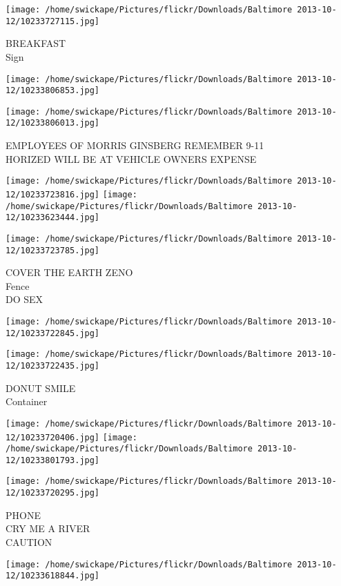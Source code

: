 \documentclass[10pt,letterpaper]{article}
\begin{document}
\vspace{0.25in}
\texttt{[image: /home/swickape/Pictures/flickr/Downloads/Baltimore 2013-10-12/10233727115.jpg]}

BREAKFAST\\
Sign
\pagebreak

\texttt{[image: /home/swickape/Pictures/flickr/Downloads/Baltimore 2013-10-12/10233806853.jpg]}

\vspace{0.25in}
\texttt{[image: /home/swickape/Pictures/flickr/Downloads/Baltimore 2013-10-12/10233806013.jpg]}

EMPLOYEES OF MORRIS GINSBERG REMEMBER 9{-}11\\
HORIZED WILL BE AT VEHICLE OWNERS EXPENSE
\pagebreak

\texttt{[image: /home/swickape/Pictures/flickr/Downloads/Baltimore 2013-10-12/10233723816.jpg]}
\texttt{[image: /home/swickape/Pictures/flickr/Downloads/Baltimore 2013-10-12/10233623444.jpg]}

\texttt{[image: /home/swickape/Pictures/flickr/Downloads/Baltimore 2013-10-12/10233723785.jpg]}

COVER THE EARTH ZENO\\
Fence\\
DO SEX
\pagebreak

\texttt{[image: /home/swickape/Pictures/flickr/Downloads/Baltimore 2013-10-12/10233722845.jpg]}

\vspace{0.25in}
\texttt{[image: /home/swickape/Pictures/flickr/Downloads/Baltimore 2013-10-12/10233722435.jpg]}

DONUT SMILE\\
Container
\pagebreak

\texttt{[image: /home/swickape/Pictures/flickr/Downloads/Baltimore 2013-10-12/10233720406.jpg]}
\texttt{[image: /home/swickape/Pictures/flickr/Downloads/Baltimore 2013-10-12/10233801793.jpg]}

\texttt{[image: /home/swickape/Pictures/flickr/Downloads/Baltimore 2013-10-12/10233720295.jpg]}

PHONE\\
CRY ME A RIVER\\
CAUTION
\pagebreak

\texttt{[image: /home/swickape/Pictures/flickr/Downloads/Baltimore 2013-10-12/10233618844.jpg]}
\end{document}
